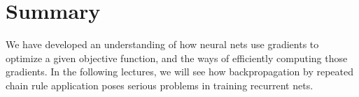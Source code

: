 \section{Summary}
\label{sec:5}

We have developed an understanding of how neural nets use gradients to optimize a given objective function, and the ways of efficiently computing those gradients. In the following lectures, we will see how backpropagation by repeated chain rule application poses serious problems in training recurrent nets. 
